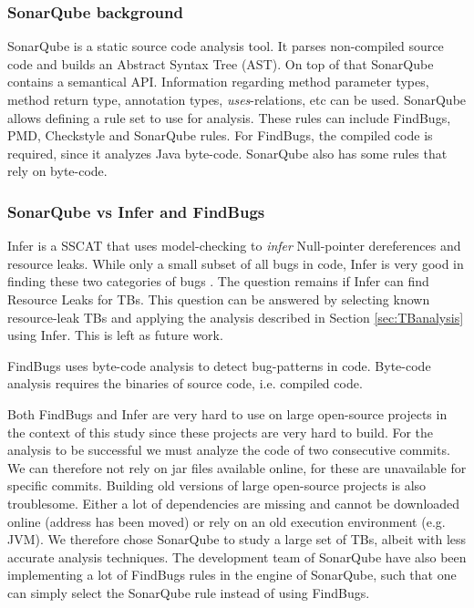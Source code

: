 \documentclass{uvamscse}
\begin{document}
\subsubsection{SonarQube background}
SonarQube is a static source code analysis tool. It parses non-compiled source code and builds an Abstract Syntax Tree (AST). On top of that SonarQube contains a semantical API. Information regarding method parameter types, method return type, annotation types, \emph{uses}-relations, etc can be used. SonarQube allows defining a rule set to use for analysis. These rules can include FindBugs, PMD, Checkstyle and SonarQube rules. For FindBugs, the compiled code is required, since it analyzes Java byte-code. SonarQube also has some rules that rely on byte-code. 

\subsubsection{SonarQube vs Infer and FindBugs}
Infer is a SSCAT that uses model-checking to \emph{infer} Null-pointer dereferences and resource leaks. While only a small subset of all bugs in code, Infer is very good in finding these two categories of bugs . The question remains if Infer can find Resource Leaks for TBs. This question can be answered by selecting known resource-leak TBs and applying the analysis described in Section \ref{sec:TBanalysis} using Infer. This is left as future work.

FindBugs uses byte-code analysis to detect bug-patterns in code. Byte-code analysis requires the binaries of source code, i.e. compiled code. 

Both FindBugs and Infer are very hard to use on large open-source projects in the context of this study since these projects are very hard to build. For the analysis to be successful we must analyze the code of two consecutive commits. We can therefore not rely on jar files available online, for these are unavailable for specific commits. Building old versions of large open-source projects is also troublesome. Either a lot of dependencies are missing and cannot be downloaded online (address has been moved) or rely on an old execution environment (e.g. JVM). We therefore chose SonarQube to study a large set of TBs, albeit with less accurate analysis techniques. The development team of SonarQube have also been implementing a lot of FindBugs rules in the engine of SonarQube, such that one can simply select the SonarQube rule instead of using FindBugs.
\end{document}

